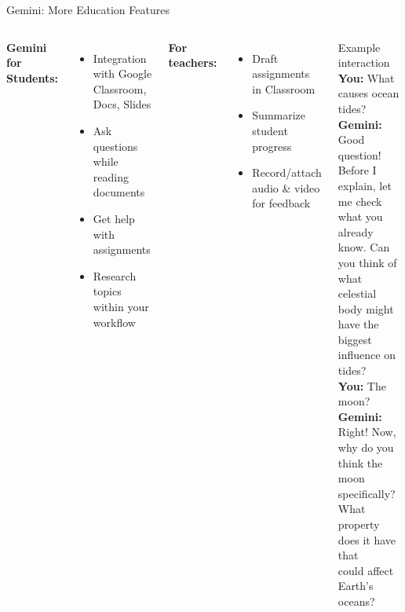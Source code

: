 \documentclass[aspectratio=169]{beamer}
\begin{document}
\begin{frame}{Gemini: More Education Features}

\begin{columns}[T]
\textbf{\color{paramgreen}Gemini for Students:}
\begin{itemize}
  \item Integration with Google Classroom, Docs, Slides
  \item Ask questions while reading documents
  \item Get help with assignments
  \item Research topics within your workflow
\end{itemize}

\bigskip
\textbf{\color{paramgreen}For teachers:}
\begin{itemize}
  \item Draft assignments in Classroom
  \item Summarize student progress
  \item Record/attach audio \& video for feedback
\end{itemize}

\begin{block}{Example interaction}
\ttfamily\scriptsize
\textbf{You:} What causes ocean tides?\\[4pt]
\textbf{Gemini:} Good question! Before I\\
explain, let me check what you\\
already know. Can you think of\\
what celestial body might have the\\
biggest influence on tides?\\[4pt]
\textbf{You:} The moon?\\[4pt]
\textbf{Gemini:} Right! Now, why do you\\
think the moon specifically?\\
What property does it have that\\
could affect Earth's oceans?
\end{block}
\end{columns}
\end{frame}
\end{document}
